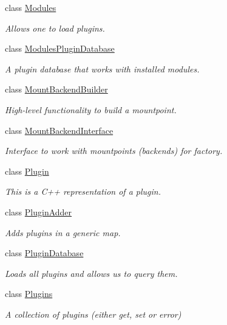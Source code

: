 \begin{DoxyCompactItemize}
class \mbox{\hyperlink{classkdb_1_1tools_1_1Modules}{Modules}}
\begin{DoxyCompactList}\small\item\em Allows one to load plugins. \end{DoxyCompactList}\item 
class \mbox{\hyperlink{classkdb_1_1tools_1_1ModulesPluginDatabase}{Modules\+Plugin\+Database}}
\begin{DoxyCompactList}\small\item\em A plugin database that works with installed modules. \end{DoxyCompactList}\item 
class \mbox{\hyperlink{classkdb_1_1tools_1_1MountBackendBuilder}{Mount\+Backend\+Builder}}
\begin{DoxyCompactList}\small\item\em High-\/level functionality to build a mountpoint. \end{DoxyCompactList}\item 
class \mbox{\hyperlink{classkdb_1_1tools_1_1MountBackendInterface}{Mount\+Backend\+Interface}}
\begin{DoxyCompactList}\small\item\em Interface to work with mountpoints (backends) for factory. \end{DoxyCompactList}\item 
class \mbox{\hyperlink{classkdb_1_1tools_1_1Plugin}{Plugin}}
\begin{DoxyCompactList}\small\item\em This is a C++ representation of a plugin. \end{DoxyCompactList}\item 
class \mbox{\hyperlink{classkdb_1_1tools_1_1PluginAdder}{Plugin\+Adder}}
\begin{DoxyCompactList}\small\item\em Adds plugins in a generic map. \end{DoxyCompactList}\item 
class \mbox{\hyperlink{classkdb_1_1tools_1_1PluginDatabase}{Plugin\+Database}}
\begin{DoxyCompactList}\small\item\em Loads all plugins and allows us to query them. \end{DoxyCompactList}\item 
class \mbox{\hyperlink{classkdb_1_1tools_1_1Plugins}{Plugins}}
\begin{DoxyCompactList}\small\item\em A collection of plugins (either get, set or error) \end{DoxyCompactList}\item 

\end{DoxyCompactItemize}
